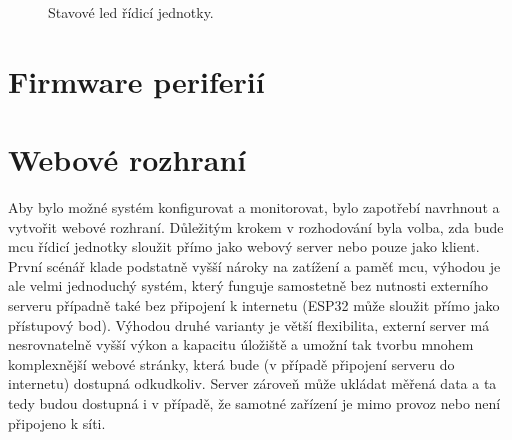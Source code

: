 \begin{figure}[h!]
            
            \caption{Stavové \acs{led} řídicí jednotky.}
            \label{fig:stavove-led-mainboard}
        \end{figure}

    \subsection{}



\section{Firmware periferií}
\section{Webové rozhraní}
    Aby bylo možné systém konfigurovat a monitorovat, bylo zapotřebí navrhnout a vytvořit webové rozhraní. Důležitým krokem v rozhodování byla volba, zda bude \acs{mcu} řídicí jednotky sloužit přímo jako webový server nebo pouze jako klient. První scénář klade podstatně vyšší nároky na zatížení a paměť \acs{mcu}, výhodou je ale velmi jednoduchý systém, který funguje samostetně bez nutnosti externího serveru případně také bez připojení k internetu (ESP32 může sloužit přímo jako přístupový bod). Výhodou druhé varianty je větší flexibilita, externí server má nesrovnatelně vyšší výkon a kapacitu úložiště a umožní tak tvorbu mnohem komplexnější webové stránky, která bude (v případě připojení serveru do internetu) dostupná odkudkoliv. Server zároveň může ukládat měřená data a ta tedy budou dostupná i v případě, že samotné zařízení je mimo provoz nebo není připojeno k síti.


